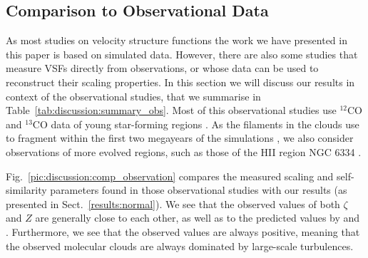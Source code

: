 \subsection{Comparison to Observational Data}\label{discussion:observation}


As most studies on velocity structure functions the work we have presented in this paper is based on simulated data.
However, there are also some studies that measure VSFs directly from observations, or whose data can be used to reconstruct their scaling properties. 
In this section we will discuss our results in context of the observational studies, that we summarise in Table~\ref{tab:discussion:summary_obs}.
Most of this observational studies use $^{12}$CO and $^{13}$CO data of young star-forming regions \citep[e.g., Perseus and Taurus][]{Padoan2003}.
As the filaments in the clouds use to fragment within the first two megayears of the simulations , we also consider observations of more evolved regions, such as those of the HII region NGC 6334 \citep{Zernickel2015}.






Fig.~\ref{pic:discussion:comp_observation} compares the measured scaling and self-similarity parameters found in those observational studies with our results (as presented in Sect.~\ref{results:normal}).
We see that the observed values of both $\zeta$ and $Z$ are generally close to each other, as well as to the predicted values by \citet{She1994} and \citet{Boldyrev2002}. 
Furthermore, we see that the observed values are always positive, meaning that the observed molecular clouds are always dominated by large-scale turbulences.

